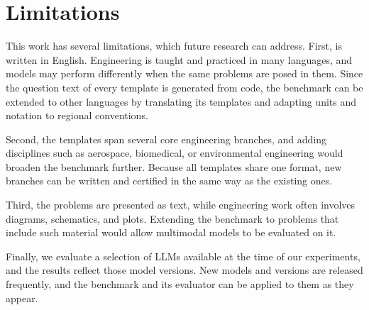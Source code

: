 \section*{Limitations}
\label{sec:limitations}

This work has several limitations, which future research can address.
First, \ourdataset is written in English.
Engineering is taught and practiced in many languages, and models may perform differently when the
same problems are posed in them.
Since the question text of every template is generated from code, the benchmark can be extended to
other languages by translating its templates and adapting units and notation to regional
conventions.

Second, the templates span several core engineering branches, and adding disciplines such as
aerospace, biomedical, or environmental engineering would broaden the benchmark further.
Because all templates share one format, new branches can be written and certified in the same way as
the existing ones.

Third, the problems are presented as text, while engineering work often involves diagrams,
schematics, and plots.
Extending the benchmark to problems that include such material would allow multimodal models to be
evaluated on it.

Finally, we evaluate a selection of LLMs available at the time of our experiments, and the results
reflect those model versions.
New models and versions are released frequently, and the benchmark and its evaluator can be applied
to them as they appear.
